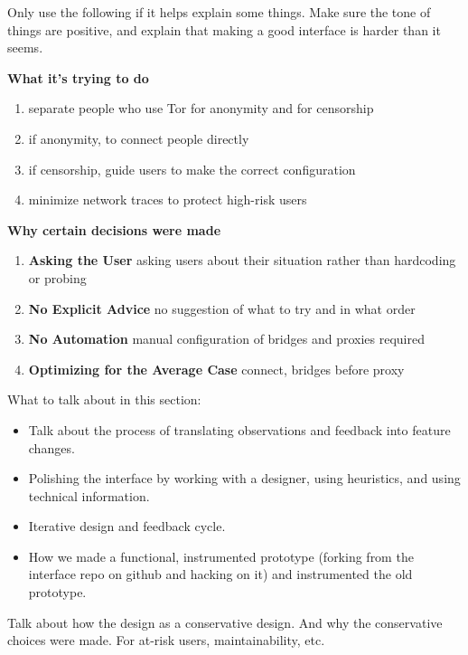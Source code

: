 \documentclass{template}
\begin{document}
{\color {red} 

Only use the following if it helps explain some things. Make sure the tone of things are positive, and explain that making a good interface is harder than it seems.

{\bfseries What it's trying to do}
\begin{enumerate} \itemsep1pt \parskip0pt 
    \item separate people who use Tor for anonymity and for censorship 
    \item if anonymity, to connect people directly
    \item if censorship, guide users to make the correct configuration
    \item minimize network traces to protect high-risk users
\end{enumerate}


{\bfseries Why certain decisions were made}
{\color {red} 
\begin{enumerate} \itemsep1pt \parskip0pt 
    \item {\bfseries Asking the User} asking users about their situation rather than hardcoding or probing
    \item {\bfseries No Explicit Advice} no suggestion of what to try and in what order
    \item {\bfseries No Automation} manual configuration of bridges and proxies required
    \item {\bfseries Optimizing for the Average Case} connect, bridges before proxy
\end{enumerate}
}

What to talk about in this section: 
\begin{itemize} \itemsep1pt \parskip0pt  
\item Talk about the process of translating observations and feedback into feature changes. 
\item Polishing the interface by working with a designer, using heuristics, and using technical information. 
\item Iterative design and feedback cycle. 
\item How we made a functional, instrumented prototype (forking from the interface repo on github and hacking on it) and instrumented the old prototype. 
\end{itemize} 

Talk about how the design as a conservative design. And why the conservative choices were made. For at-risk users, maintainability, etc.
}
\end{document}
